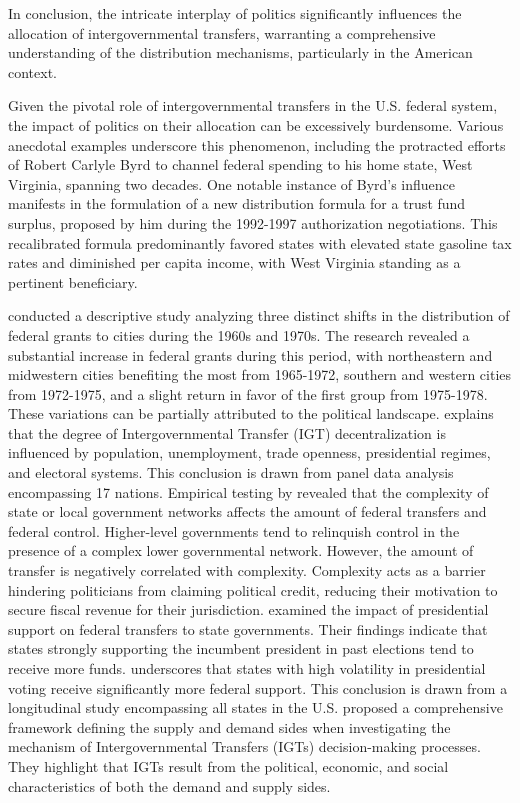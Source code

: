 \documentclass[man]{apa7}
\begin{document}
In conclusion, the intricate interplay of politics significantly influences the allocation of intergovernmental transfers, warranting a comprehensive understanding of the distribution mechanisms, particularly in the American context.

Given the pivotal role of intergovernmental transfers in the U.S. federal system, the impact of politics on their allocation can be excessively burdensome. Various anecdotal examples underscore this phenomenon, including the protracted efforts of Robert Carlyle Byrd to channel federal spending to his home state, West Virginia, spanning two decades. One notable instance of Byrd's influence manifests in the formulation of a new distribution formula for a trust fund surplus, proposed by him during the 1992-1997 authorization negotiations. This recalibrated formula predominantly favored states with elevated state gasoline tax rates and diminished per capita income, with West Virginia standing as a pertinent beneficiary.%

\textcite{markusen1981benefits} conducted a descriptive study analyzing three distinct shifts in the distribution of federal grants to cities during the 1960s and 1970s. The research revealed a substantial increase in federal grants during this period, with northeastern and midwestern cities benefiting the most from 1965-1972, southern and western cities from 1972-1975, and a slight return in favor of the first group from 1975-1978. These variations can be partially attributed to the political landscape. \textcite{stegarescu2006decentralised} explains that the degree of Intergovernmental Transfer (IGT) decentralization is influenced by population, unemployment, trade openness, presidential regimes, and electoral systems. This conclusion is drawn from panel data analysis encompassing 17 nations. Empirical testing by \textcite{kasdin2016decision} revealed that the complexity of state or local government networks affects the amount of federal transfers and federal control. Higher-level governments tend to relinquish control in the presence of a complex lower governmental network. However, the amount of transfer is negatively correlated with complexity. Complexity acts as a barrier hindering politicians from claiming political credit, reducing their motivation to secure fiscal revenue for their jurisdiction. \textcite{larcinese2006allocating} examined the impact of presidential support on federal transfers to state governments. Their findings indicate that states strongly supporting the incumbent president in past elections tend to receive more funds. \textcite{wallis1987employment} underscores that states with high volatility in presidential voting receive significantly more federal support. This conclusion is drawn from a longitudinal study encompassing all states in the U.S. \textcite{markusen1981benefits} proposed a comprehensive framework defining the supply and demand sides when investigating the mechanism of Intergovernmental Transfers (IGTs) decision-making processes. They highlight that IGTs result from the political, economic, and social characteristics of both the demand and supply sides. %
\end{document}

